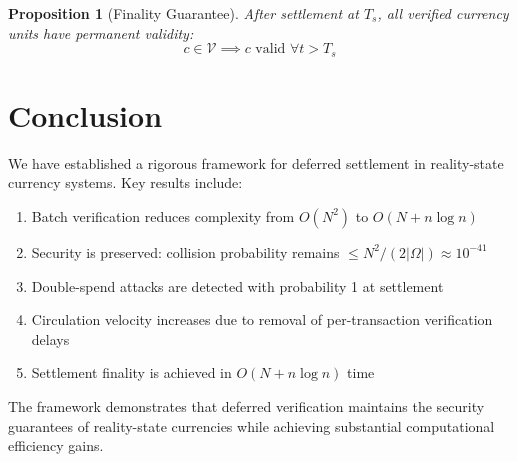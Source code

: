 \documentclass[12pt]{article}
\newtheorem{proposition}[theorem]{Proposition}
\begin{document}
\begin{proposition}[Finality Guarantee]
After settlement at $T_s$, all verified currency units have permanent validity:
$$
c \in \mathcal{V} \implies c \text{ valid } \forall t > T_s
$$
\end{proposition}

\section{Conclusion}

We have established a rigorous framework for deferred settlement in reality-state currency systems. Key results include:

\begin{enumerate}
    \item Batch verification reduces complexity from $O(N^2)$ to $O(N + n\log n)$
    \item Security is preserved: collision probability remains $\leq N^2/(2|\Omega|) \approx 10^{-41}$
    \item Double-spend attacks are detected with probability 1 at settlement
    \item Circulation velocity increases due to removal of per-transaction verification delays
    \item Settlement finality is achieved in $O(N + n\log n)$ time
\end{enumerate}

The framework demonstrates that deferred verification maintains the security guarantees of reality-state currencies while achieving substantial computational efficiency gains.
\end{document}
